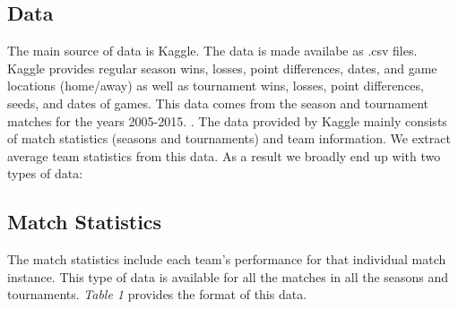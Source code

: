\documentclass{article}
\begin{document}
\begin{multicols}{2}
	\section{Data}
	The main source of data is Kaggle. The data is made availabe as .csv files. Kaggle provides regular season wins, losses, point differences, dates, and game locations (home/away) as well as tournament wins, losses, point differences, seeds, and dates of games. This data comes from the season and tournament matches for the years 2005-2015. \cite{1}. 
	\linebreak 
	The data provided by Kaggle mainly consists of match statistics (seasons and tournaments) and team information. We extract average team statistics from this data. As a result we broadly end up with two types of data: \cite{1}

	\subsection{Match Statistics}
	The match statistics include each team's performance for that individual match instance. This type of data is available for all the matches in all the seasons and tournaments. \textit{Table 1} provides the format of this data. 	\newline \linebreak

	\end{multicols}  	
	\begin{center}
	\end{center}
	\begin{center}	
	\end{center}
\end{document}
